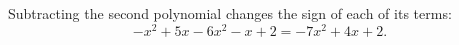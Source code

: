 Subtracting the second polynomial changes the sign of each of its terms:
\[-x^2+5x-6x^2-x+2=\boxed{-7x^2+4x+2}.\]
